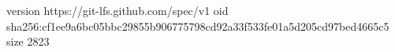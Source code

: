version https://git-lfs.github.com/spec/v1
oid sha256:cf1ee9a6bc05bbc29855b906775798cd92a33f533fe01a5d205cd97bed4665c5
size 2823
